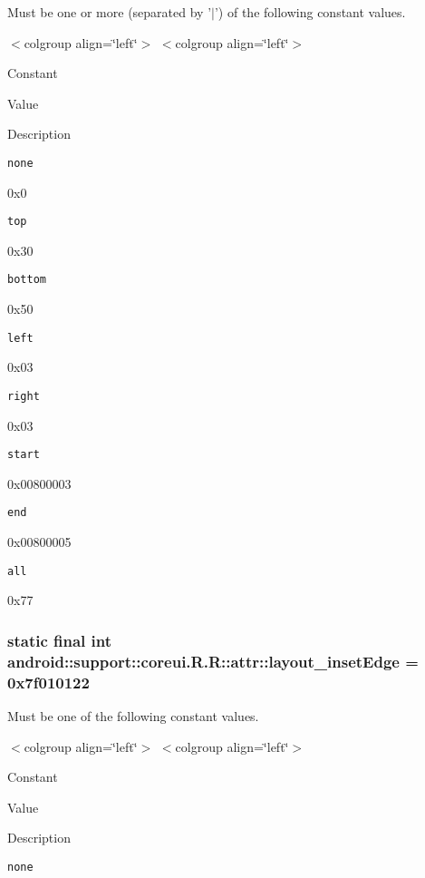 Must be one or more (separated by '$|$') of the following constant values. \begin{TabularC}{0}
\hline
\end{TabularC}
$<$colgroup align=\char`\"{}left\char`\"{}$>$ $<$colgroup align=\char`\"{}left\char`\"{}$>$ 

Constant

Value

Description 

{\tt none}

0x0

{\tt top}

0x30

{\tt bottom}

0x50

{\tt left}

0x03

{\tt right}

0x03

{\tt start}

0x00800003

{\tt end}

0x00800005

{\tt all}

0x77\hypertarget{classandroid_1_1support_1_1coreui_1_1_r_1_1attr_6b6219e2358bbeec5b73abc4e5e03c9c}{
\subsubsection[{layout\_\-insetEdge}]{\setlength{\rightskip}{0pt plus 5cm}static final int android::support::coreui.R.R::attr::layout\_\-insetEdge = 0x7f010122}}
\label{classandroid_1_1support_1_1coreui_1_1_r_1_1attr_6b6219e2358bbeec5b73abc4e5e03c9c}


Must be one of the following constant values. \begin{TabularC}{0}
\hline
\end{TabularC}
$<$colgroup align=\char`\"{}left\char`\"{}$>$ $<$colgroup align=\char`\"{}left\char`\"{}$>$ 

Constant

Value

Description 

{\tt none}

